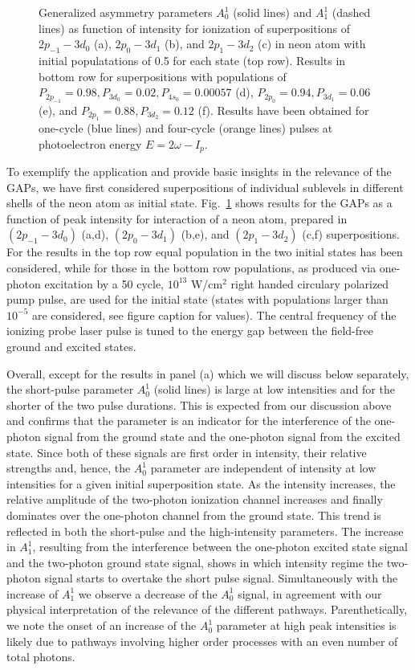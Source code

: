 \begin{figure}[t]
\caption{
Generalized asymmetry parameters $A_0^1$ (solid lines) and $A_1^1$ (dashed lines) as function of intensity for ionization of  superpositions of $2p_{-1}-3d_0$ (a), $2p_{0}-3d_1$ (b), and $2p_{1}-3d_2$ (c) in neon atom with initial populatations of 0.5 for each state (top row). Results in bottom row for superpositions with populations of $P_{2p_{-1}}=0.98,P_{3d_0}=0.02,P_{4s_0}=0.00057$ (d), $P_{2p_{0}}=0.94,P_{3d_1}=0.06$ (e), and $P_{2p_{1}}=0.88,P_{3d_2}=0.12$ (f). Results have been obtained for one-cycle (blue lines) and four-cycle (orange lines) pulses at photoelectron energy $E = 2\omega-I_p$.
} 
  \label{fig:Neon-1-photon}
\end{figure}

To exemplify the application and provide basic insights in the relevance of the GAPs, we have first considered superpositions of individual sublevels in different shells of the neon atom as initial state. Fig.~\ref{fig:Neon-1-photon} shows results for the GAPs as a function of peak intensity for interaction of a neon atom, prepared in $(2p_{-1}-3d_0)$ (a,d), $(2p_{0}-3d_1)$ (b,e),  and $(2p_{1}-3d_2)$ (c,f) superpositions. For the results in the top row equal population in the two initial states has been considered, while for those in the bottom row populations, as produced via one-photon excitation by a 50 cycle, $10^{13}$ W/cm$^2$ right handed circulary polarized pump pulse, are used for the initial state  
(states with populations larger than $10^{-5}$ are considered, see figure caption for values). The central frequency of the ionizing probe laser pulse is tuned to the energy gap between the field-free ground and excited states. 

Overall, except for the results in panel (a) which we will discuss below separately, the short-pulse parameter $A_0^1$ (solid lines) is large at low intensities and for the shorter of the two pulse durations. This is expected from our discussion above and confirms that the parameter is an indicator for the interference of the one-photon signal from the ground state and the one-photon signal from the excited state. Since both of these signals
are 
first order in intensity, their relative strengths and, hence, the $A_0^1$ parameter are independent of intensity at low intensities for a given initial superposition state. As the intensity increases, the relative amplitude of the two-photon ionization channel increases and finally dominates over the one-photon channel from the ground state. This trend is reflected in both the short-pulse and the high-intensity parameters. The increase in $A_1^1$, resulting from the interference between the one-photon excited state signal and the two-photon ground state signal, shows in which intensity regime the two-photon signal starts to overtake the short pulse signal. Simultaneously with the increase of $A_1^1$ we observe a decrease of the $A_0^1$ signal, in agreement with our physical interpretation of the relevance of the different pathways. Parenthetically, we note the onset of an increase of the $A_0^1$ parameter at high peak intensities is likely due to pathways involving higher order processes with an even number of total photons.

